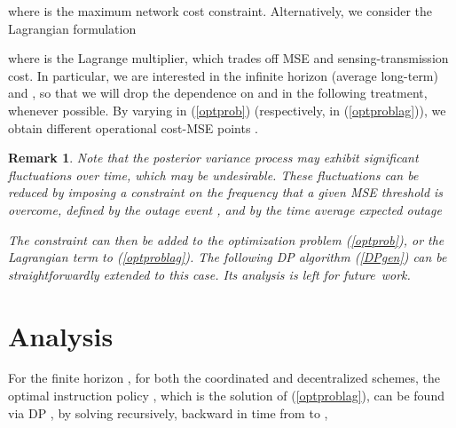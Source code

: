 \documentclass[10pt,twocolumn,twoside]{IEEEtran}
\theoremstyle{plain}
\newtheorem{remark}{Remark}
\begin{document}
where  is the maximum network cost constraint.
Alternatively,
we consider the Lagrangian formulation

where  is the Lagrange multiplier, which trades off MSE and sensing-transmission cost.
 In particular, we are interested in the infinite horizon   (average long-term)
 and ,
 so that we will drop the dependence  on  and  in the following treatment, whenever possible.
 By varying  in (\ref{optprob}) (respectively,  in (\ref{optproblag})),
we obtain different operational cost-MSE points .
\vspace{-3mm}
\begin{remark}
\label{remoutage}
Note that the posterior variance process  may exhibit significant fluctuations over time, which may be undesirable. 
These fluctuations can be reduced by imposing a constraint on the frequency that a given MSE threshold  is overcome,
defined by the \emph{outage} event , and by the time average expected outage

The constraint 
can then be added to the optimization problem (\ref{optprob}), or the Lagrangian term 
to  (\ref{optproblag}).
The following DP algorithm (\ref{DPgen}) can be straightforwardly extended to this case. Its analysis is left for future~work.
\end{remark}
\vspace{-0.3cm}
\section{Analysis}
\label{analysis}
\noindent For the finite horizon , for both the coordinated and decentralized schemes, the optimal instruction policy ,
which is the solution of (\ref{optproblag}), can be found
via DP \cite{Bertsekas2005}, by solving recursively, backward in time from  to ,
\end{document}
